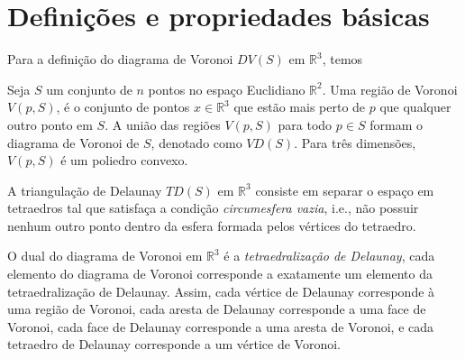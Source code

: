 \section{Definições e propriedades básicas}

Para a definição do diagrama de Voronoi $DV(S)$ em $\mathbb{R}^3$, temos
\begin{definicao}
    Seja $S$ um conjunto de $n$ pontos no espaço Euclidiano $\mathbb{R}^2$. Uma região
    de Voronoi $V(p,S)$, é o conjunto de pontos $x \in \mathbb{R}^3$ que estão mais perto de 
    $p$ que qualquer outro ponto em $S$. A união das regiões $V(p,S)$ para todo $p \in S$ 
    formam o diagrama de Voronoi de $S$, denotado como $VD(S)$. Para três dimensões,
    $V(p,S)$ é um poliedro convexo. 
\end{definicao}

\begin{definicao}
    A triangulação de Delaunay $TD(S)$ em $\mathbb{R}^3$ consiste em separar o espaço em tetraedros tal que
    satisfaça a condição \textit{circumesfera vazia}, i.e., não possuir nenhum outro
    ponto dentro da esfera formada pelos vértices do tetraedro. 
\end{definicao}

O dual do diagrama de Voronoi em $\mathbb{R}^3$ é a \textit{tetraedralização de Delaunay}, 
cada elemento do diagrama de Voronoi corresponde a exatamente um elemento da 
tetraedralização de Delaunay. Assim, cada vértice de Delaunay corresponde à 
uma região de Voronoi, cada aresta de Delaunay corresponde a uma face de Voronoi,
cada face de Delaunay corresponde a uma aresta de Voronoi, e cada tetraedro de
Delaunay corresponde a um vértice de Voronoi.
